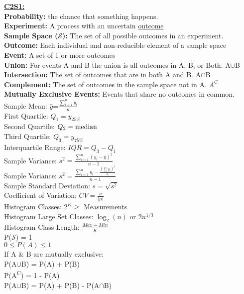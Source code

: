\documentclass[letter, 12pt]{article}
\begin{document}
\newpage
\begin{multicols}{2}
\textbf{\uline{C2S1:}}\\
\textbf{Probability:} the chance that something happens.\\
\textbf{Experiment:} A process with an uncertain \uline{outcome}\\
\textbf{Sample Space ($\mathscr{S}$):} The set of all possible outcomes in an experiment.\\
\textbf{Outcome:} Each individual and non-reducible element of a sample space\\
\textbf{Event:} A set of 1 or more outcomes\\
\textbf{Union:} For events A and B the union is all outcomes in A, B, or Both. A$\cup$B\\
\textbf{Intersection:} The set of outcomes that are in both A and B. A$\cap$B\\
\textbf{Complement:} The set of outcomes in the sample space not in A. $A^C$\\
\textbf{Mutually Exclusive Events:} Events that share no outcomes in common.\\

\vfill
\columnbreak
\vspace*{\fill}
Sample Mean: $\bar{y}$=$\frac{\sum_{i=1}^n y_i}{n}$\\
First Quartile: $Q_1=y_{25\%}$\\
Second Quartile: $Q_2=\textnormal{median}$\\
Third Quartile: $Q_3=y_{75\%}$\\
Interquartile Range: $IQR=Q_3-Q_1$\\
Sample Variance: $s^2=\frac{\sum_{i=1}^n (y_i-\bar{y})^2}{n-1}$\\
Sample Variance: $s^2=\frac{\sum_{i=1}^n y_i - \frac{(\sum y_i)^2}{n}}{n-1}$\\
Sample Standard Deviation: $s=\sqrt{s^2}$\\
Coefficient of Variation: $CV=\frac{\sigma}{\lvert\mu\rvert}$\\
Histogram Classes: $2^K \geq$ Measurements\\
Histogram Large Set Classes: $\log_2(n)$ or $2n^{1/3}$\\
Histogram Class Length: $\frac{Max-Min}{K}$\\
P($\mathscr{S}$) = 1\\
$0\leq P(A) \leq 1$\\
If A \& B are mutually exclusive:\\ P(A$\cup$B) = P(A) + P(B)\\ 
P(A\textsuperscript{C}) = 1 - P(A)\\
P(A$\cup$B) = P(A) + P(B) - P(A$\cap$B)\\

\end{multicols}
\end{document}
